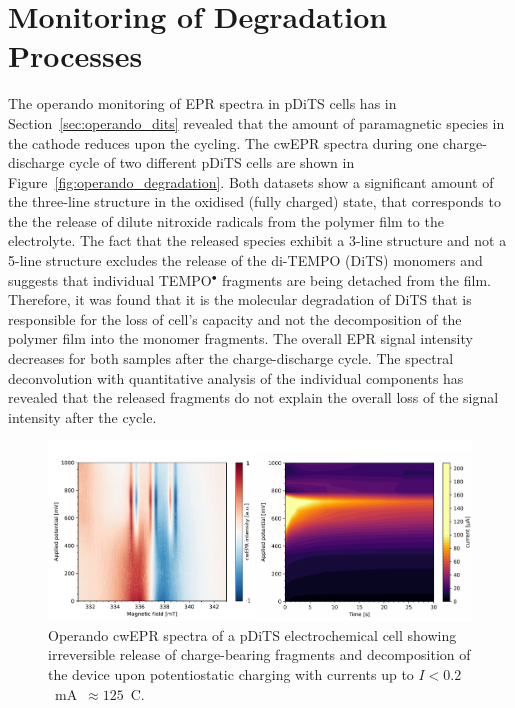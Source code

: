 \section{Monitoring of Degradation Processes}
\label{Degradation_study}
The operando monitoring of EPR spectra in pDiTS cells has in Section~\ref{sec:operando_dits} revealed that the amount of paramagnetic species in the cathode reduces upon the cycling. The cwEPR spectra during one charge-discharge cycle of two different pDiTS cells are shown in Figure~\ref{fig:operando_degradation}. Both datasets show a significant amount of the three-line structure in the oxidised (fully charged) state, that corresponds to the the release of dilute nitroxide radicals from the polymer film to the electrolyte. The fact that the released species exhibit a 3-line structure and not a 5-line structure excludes the release of the di-TEMPO (DiTS) monomers and suggests that individual TEMPO$^{\bullet}$ fragments are being detached from the film. Therefore, it was found that it is the molecular degradation of DiTS that is responsible for the loss of cell's capacity and not the decomposition of the polymer film into the monomer fragments. The overall EPR signal intensity decreases for both samples after the charge-discharge cycle. The spectral deconvolution with quantitative analysis of the individual components has revealed that the released fragments do not explain the overall loss of the signal intensity after the cycle.\\


\begin{figure}[!h]
\center
	\includegraphics[width=1\textwidth]{./operando_epr/figures/degradation/overnight_dits_201211_full_redox_contour_XY.pdf}
	\caption{Operando cwEPR spectra of a pDiTS electrochemical cell showing irreversible release of charge-bearing fragments and decomposition of the device upon potentiostatic charging with currents up to $I<0.2$~mA~$\approx125$~C.}
	\label{fig:operando_degradation_device}
\end{figure}


